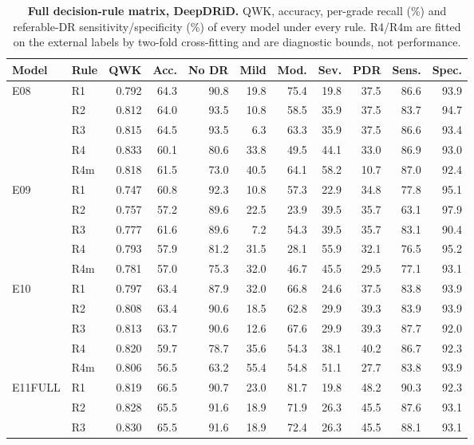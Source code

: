 \begin{table}[h]
\caption{\textbf{Full decision-rule matrix, DeepDRiD.} QWK, accuracy, per-grade recall (\%) and referable-DR sensitivity/specificity (\%) of every model under every rule. R4/R4m are fitted on the external labels by two-fold cross-fitting and are diagnostic bounds, not performance.}\label{tab:rules_deepdrid}
\centering\scriptsize
\begin{tabular}{@{}llrrrrrrrrr@{}}
\toprule
Model & Rule & QWK & Acc. & No DR & Mild & Mod. & Sev. & PDR & Sens. & Spec. \\
\midrule
E08 & R1 & 0.792 & 64.3 & 90.8 & 19.8 & 75.4 & 19.8 & 37.5 & 86.6 & 93.9 \\
 & R2 & 0.812 & 64.0 & 93.5 & 10.8 & 58.5 & 35.9 & 37.5 & 83.7 & 94.7 \\
 & R3 & 0.815 & 64.5 & 93.5 & 6.3 & 63.3 & 35.9 & 37.5 & 86.6 & 93.4 \\
 & R4 & 0.833 & 60.1 & 80.6 & 33.8 & 49.5 & 44.1 & 33.0 & 86.9 & 93.0 \\
 & R4m & 0.818 & 61.5 & 73.0 & 40.5 & 64.1 & 58.2 & 10.7 & 87.0 & 92.4 \\
\addlinespace
E09 & R1 & 0.747 & 60.8 & 92.3 & 10.8 & 57.3 & 22.9 & 34.8 & 77.8 & 95.1 \\
 & R2 & 0.757 & 57.2 & 89.6 & 22.5 & 23.9 & 39.5 & 35.7 & 63.1 & 97.9 \\
 & R3 & 0.777 & 61.6 & 89.6 & 7.2 & 54.3 & 39.5 & 35.7 & 83.1 & 90.4 \\
 & R4 & 0.793 & 57.9 & 81.2 & 31.5 & 28.1 & 55.9 & 32.1 & 76.5 & 95.2 \\
 & R4m & 0.781 & 57.0 & 75.3 & 32.0 & 46.7 & 45.5 & 29.5 & 77.1 & 93.1 \\
\addlinespace
E10 & R1 & 0.797 & 63.4 & 87.9 & 32.0 & 66.8 & 24.6 & 37.5 & 83.8 & 93.9 \\
 & R2 & 0.808 & 63.4 & 90.6 & 18.5 & 62.8 & 29.9 & 39.3 & 83.9 & 93.9 \\
 & R3 & 0.813 & 63.7 & 90.6 & 12.6 & 67.6 & 29.9 & 39.3 & 87.7 & 92.0 \\
 & R4 & 0.820 & 59.7 & 78.7 & 35.6 & 54.3 & 38.1 & 40.2 & 86.7 & 92.3 \\
 & R4m & 0.806 & 56.5 & 63.2 & 55.4 & 54.8 & 51.1 & 27.7 & 83.8 & 93.9 \\
\addlinespace
E11FULL & R1 & 0.819 & 66.5 & 90.7 & 23.0 & 81.7 & 19.8 & 48.2 & 90.3 & 92.3 \\
 & R2 & 0.828 & 65.5 & 91.6 & 18.9 & 71.9 & 26.3 & 45.5 & 87.6 & 93.1 \\
 & R3 & 0.830 & 65.5 & 91.6 & 18.9 & 72.4 & 26.3 & 45.5 & 88.1 & 93.1 \\

\end{tabular}
\end{table}
